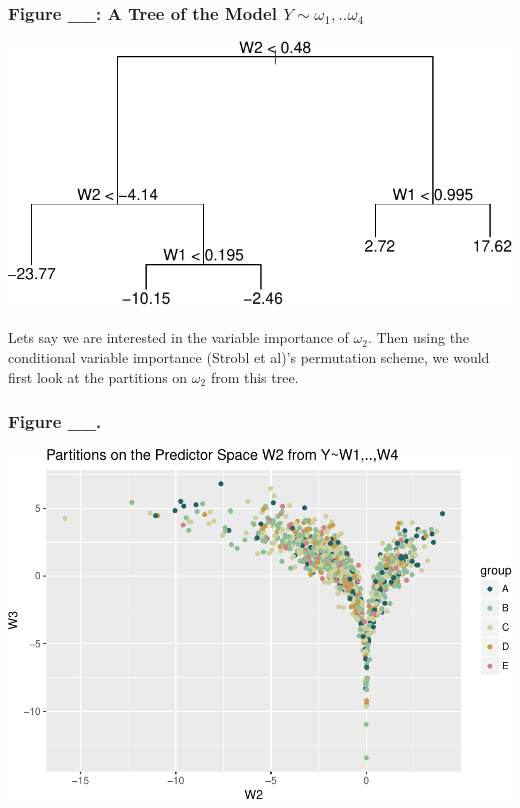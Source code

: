 \documentclass[12pt,twoside]{reedthesis}
\begin{document}
  \subsubsection{\texorpdfstring{Figure \_\_: A Tree of the Model
  \(Y \sim \omega_1,.. \omega_4\)}{Figure \_\_: A Tree of the Model Y \textbackslash{}sim \textbackslash{}omega\_1,.. \textbackslash{}omega\_4}}\label{figure-__-a-tree-of-the-model-y-sim-omega_1..-omega_4}
  
  \includegraphics{Thesis_files/figure-latex/unnamed-chunk-4-1.pdf}
  
  Lets say we are interested in the variable importance of \(\omega_2\).
  Then using the conditional variable importance (Strobl et al)'s
  permutation scheme, we would first look at the partitions on
  \(\omega_2\) from this tree.
  
  \subsubsection{Figure \_\_.}\label{figure-__.}
  
  \includegraphics{Thesis_files/figure-latex/unnamed-chunk-5-1.pdf}
  
\end{document}
